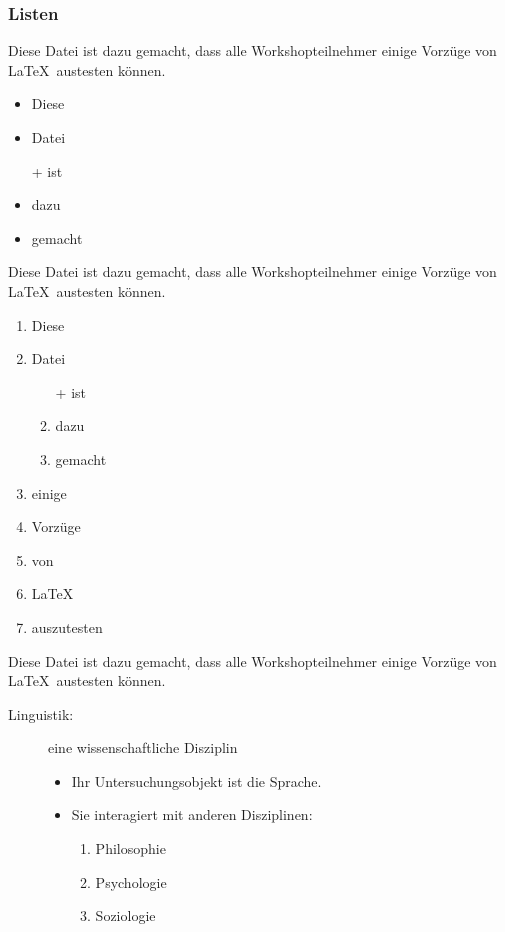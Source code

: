 \documentclass[10pt,paper=a4,abstracton]{scrartcl}
\begin{document}
\subsubsection{Listen}

Diese Datei ist dazu gemacht, dass alle Workshopteilnehmer einige Vorzüge von \LaTeX\ austesten können.
 
\begin{itemize}
	\item Diese 
	\item Datei 
	\item[+] ist 
	\item dazu 
	\item gemacht
\end{itemize} 

Diese Datei ist dazu gemacht, dass alle Workshopteilnehmer einige Vorzüge von \LaTeX\ austesten können.

\begin{enumerate}
	\item Diese 
	\item Datei 
	\begin{enumerate}
		\item[+] ist 
		\item dazu 
		\item gemacht
	\end{enumerate}
	\item einige 
	\item Vorzüge 
	\item von 
	\item \LaTeX\ 
	\item auszutesten
\end{enumerate}

Diese Datei ist dazu gemacht, dass alle Workshopteilnehmer einige Vorzüge von \LaTeX\ austesten können.

\begin{description}
	\item[Linguistik:] eine wissenschaftliche Disziplin
	\begin{itemize}
		\item Ihr Untersuchungsobjekt ist die Sprache.
		\item Sie interagiert mit anderen Disziplinen:
		\begin{enumerate}
			\item Philosophie
			\item Psychologie
			\item Soziologie
		\end{enumerate}
	\end{itemize}
\end{description}
\end{document}
